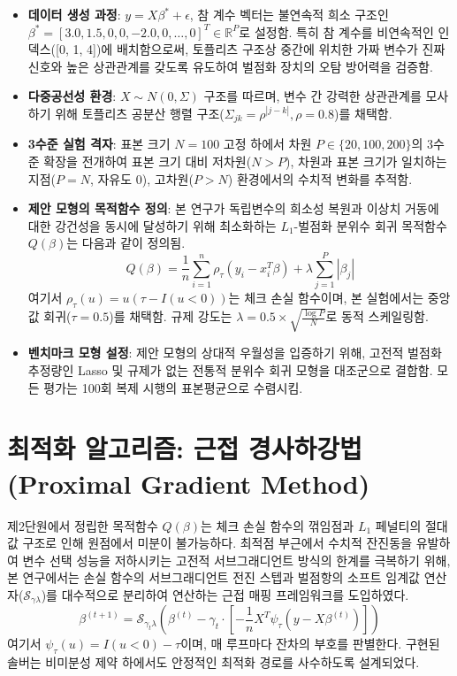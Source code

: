 \documentclass[10pt,a4paper]{article}
\begin{document}
\begin{itemize}
    \item \textbf{데이터 생성 과정}: $y = X\beta^* + \epsilon$, 참 계수 벡터는 불연속적 희소 구조인 $\beta^* = [3.0, 1.5, 0, 0, -2.0, 0, \dots, 0]^T \in \mathbb{R}^P$로 설정함. 특히 참 계수를 비연속적인 인덱스([0, 1, 4])에 배치함으로써, 토플리츠 구조상 중간에 위치한 가짜 변수가 진짜 신호와 높은 상관관계를 갖도록 유도하여 벌점화 장치의 오탐 방어력을 검증함.
    \item \textbf{다중공선성 환경}: $X \sim N(0, \Sigma)$ 구조를 따르며, 변수 간 강력한 상관관계를 모사하기 위해 토플리츠 공분산 행렬 구조($\Sigma_{jk} = \rho^{|j-k|}, \rho=0.8$)를 채택함.
    \item \textbf{3수준 실험 격자}: 표본 크기 $N=100$ 고정 하에서 차원 $P \in \{20, 100, 200\}$의 3수준 확장을 전개하여 표본 크기 대비 저차원($N>P$), 차원과 표본 크기가 일치하는 지점($P=N$, 자유도 0), 고차원($P>N$) 환경에서의 수치적 변화를 추적함.
    \item \textbf{제안 모형의 목적함수 정의}: 본 연구가 독립변수의 희소성 복원과 이상치 거동에 대한 강건성을 동시에 달성하기 위해 최소화하는 $L_1$-벌점화 분위수 회귀 목적함수 $Q(\beta)$는 다음과 같이 정의됨.
    $$Q(\beta) = \frac{1}{n}\sum_{i=1}^{n}\rho_{\tau}(y_{i}-x_{i}^{T}\beta) + \lambda \sum_{j=1}^{P}|\beta_{j}|$$
    여기서 $\rho_\tau(u) = u(\tau - I(u<0))$는 체크 손실 함수이며, 본 실험에서는 중앙값 회귀($\tau=0.5$)를 채택함. 규제 강도는 $\lambda = 0.5 \times \sqrt{\frac{\log P}{N}}$로 동적 스케일링함\cite{belloni2011}.
    \item \textbf{벤치마크 모형 설정}: 제안 모형의 상대적 우월성을 입증하기 위해, 고전적 벌점화 추정량인 Lasso\cite{tibshirani1996} 및 규제가 없는 전통적 분위수 회귀 모형\cite{koenker1978}을 대조군으로 결합함. 모든 평가는 100회 복제 시행의 표본평균으로 수렴시킴.\end{itemize}

\section{최적화 알고리즘: 근접 경사하강법 (Proximal Gradient Method)}
제2단원에서 정립한 목적함수 $Q(\beta)$는 체크 손실 함수의 꺾임점과 $L_1$ 페널티의 절대값 구조로 인해 원점에서 미분이 불가능하다. 최적점 부근에서 수치적 잔진동을 유발하여 변수 선택 성능을 저하시키는 고전적 서브그래디언트 방식의 한계를 극복하기 위해, 본 연구에서는 손실 함수의 서브그래디언트 전진 스텝과 벌점항의 소프트 임계값 연산자($\mathcal{S}_{\gamma\lambda}$)를 대수적으로 분리하여 연산하는 근접 매핑 프레임워크\cite{parikh2014}를 도입하였다.
$$\beta^{(t+1)} = \mathcal{S}_{\gamma_t \lambda} \left( \beta^{(t)} - \gamma_t \cdot \left[ -\frac{1}{n}X^T \psi_\tau(y - X\beta^{(t)}) \right] \right)$$
여기서 $\psi_\tau(u) = I(u<0) - \tau$이며, 매 루프마다 잔차의 부호를 판별한다. 구현된 솔버는 비미분성 제약 하에서도 안정적인 최적화 경로를 사수하도록 설계되었다.\cite{belloni2011}
\end{document}
